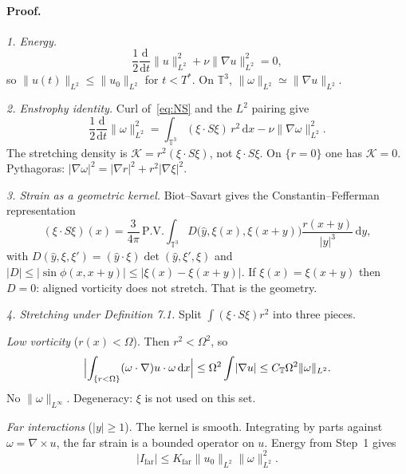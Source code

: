 \documentclass[11pt,a4paper]{article}
\theoremstyle{definition}
\theoremstyle{remark}
\newcommand{\T}{\mathbb{T}}
\newcommand{\abs}[1]{\lvert#1\rvert}
\newcommand{\norm}[1]{\lVert#1\rVert}
\newcommand{\dd}{\mathrm{d}}
\newcommand{\pv}{\mathrm{P.V.}}
\begin{document}
\paragraph{Proof.}

\textit{1. Energy.}
\[
\frac12\frac{\dd}{\dd t}\norm{u}_{L^2}^2+\nu\norm{\nabla u}_{L^2}^2=0,
\]
so \(\norm{u(t)}_{L^2}\le\norm{u_0}_{L^2}\) for \(t<T^*\). On \(\T^3\),
\(\norm{\omega}_{L^2}\simeq\norm{\nabla u}_{L^2}\).

\textit{2. Enstrophy identity.}
Curl of~\eqref{eq:NS} and the \(L^2\) pairing give
\begin{equation}
\label{eq:enst-geom}
\frac12\frac{\dd}{\dd t}\norm{\omega}_{L^2}^2
=\int_{\T^3}(\xi\cdot S\xi)\,r^2\,\dd x
-\nu\norm{\nabla\omega}_{L^2}^2.
\end{equation}
The stretching density is \(\mathcal K=r^2(\xi\cdot S\xi)\), not
\(\xi\cdot S\xi\). On \(\{r=0\}\) one has \(\mathcal K=0\).
Pythagoras: \(\abs{\nabla\omega}^2=\abs{\nabla r}^2+r^2\abs{\nabla\xi}^2\).

\textit{3. Strain as a geometric kernel.}
Biot--Savart gives the Constantin--Fefferman representation
\[
(\xi\cdot S\xi)(x)
=\frac{3}{4\pi}\,\pv\int_{\T^3}
D\bigl(\hat y,\xi(x),\xi(x+y)\bigr)
\frac{r(x+y)}{\abs{y}^3}\,\dd y,
\]
with \(D(\hat y,\xi,\xi')=(\hat y\cdot\xi)\det(\hat y,\xi',\xi)\) and
\(\abs{D}\le\abs{\sin\phi(x,x+y)}\le\abs{\xi(x)-\xi(x+y)}\).
If \(\xi(x)=\xi(x+y)\) then \(D=0\): aligned vorticity does not stretch.
That is the geometry.

\textit{4. Stretching under Definition 7.1.}
Split \(\int(\xi\cdot S\xi)r^2\) into three pieces.

\textit{Low vorticity} (\(r(x)<\Omega\)). Then \(r^2<\Omega^2\), so
\[
\Bigl|\int_{\{r<\Omega\}}(\omega\cdot\nabla)u\cdot\omega\,\dd x\Bigr|
\le\Omega^2\int\abs{\nabla u}
\le C_\T\Omega^2\norm{\omega}_{L^2}.
\]
No \(\norm{\omega}_{L^\infty}\). Degeneracy: \(\xi\) is not used on this set.

\textit{Far interactions} (\(\abs{y}\ge 1\)). The kernel is smooth.
Integrating by parts against \(\omega=\nabla\times u\), the far strain
is a bounded operator on \(u\). Energy from Step~1 gives
\[
\abs{I_{\mathrm{far}}}\le K_{\mathrm{far}}\norm{u_0}_{L^2}\norm{\omega}_{L^2}^2.
\]
\end{document}
